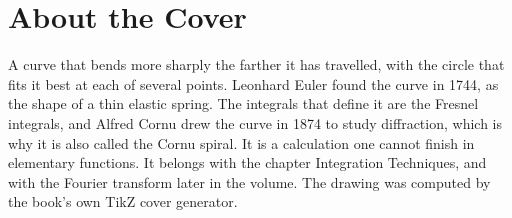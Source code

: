 \backmatter
\cleardoublepage
\chapter*{About the Cover}
\noindent A curve that bends more sharply the farther it has travelled, with the circle that fits it best at each of several points. Leonhard Euler found the curve in 1744, as the shape of a thin elastic spring. The integrals that define it are the Fresnel integrals, and Alfred Cornu drew the curve in 1874 to study diffraction, which is why it is also called the Cornu spiral. It is a calculation one cannot finish in elementary functions. It belongs with the chapter Integration Techniques, and with the Fourier transform later in the volume. The drawing was computed by the book's own TikZ cover generator.
